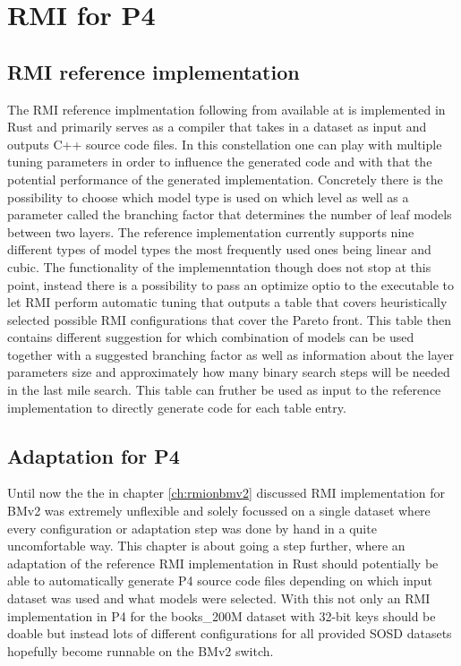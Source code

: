 
\chapter{RMI for P4}
\label{ch:rmiforp4}

\section{RMI reference implementation}
The RMI reference implmentation following from \cite{cdfshop} available at \cite{rmi-reference} is implemented in Rust and primarily serves as a compiler that takes in a dataset as input and outputs C++ source code files. In this constellation one can play with multiple tuning parameters in order to influence the generated code and with that the potential performance of the generated implementation. Concretely there is the possibility to choose which model type is used on which level as well as a parameter called the branching factor that determines the number of leaf models between two layers. The reference implementation currently supports nine different types of model types the most frequently used ones being linear and cubic. The functionality of the implemenntation though does not stop at this point, instead there is a possibility to pass an optimize optio to the executable to let RMI perform automatic tuning that outputs a table that covers heuristically selected possible RMI configurations that cover the Pareto front. This table then contains different suggestion for which combination of models can be used together with a suggested branching factor as well as information about the layer parameters size and approximately how many binary search steps will be needed in the last mile search. This table can fruther be used as input to the reference implementation to directly generate code for each table entry.

\section{Adaptation for P4}
Until now the the in chapter \ref{ch:rmionbmv2} discussed RMI implementation for BMv2 was extremely unflexible and solely focussed on a single dataset where every configuration or adaptation step was done by hand in a quite uncomfortable way. This chapter is about going a step further, where an adaptation of the reference RMI implementation in Rust should potentially be able to automatically generate P4 source code files depending on which input dataset was used and what models were selected. With this not only an RMI implementation in P4 for the books\_200M dataset with 32-bit keys should be doable but instead lots of different configurations for all provided SOSD datasets hopefully become runnable on the BMv2 switch.\\

